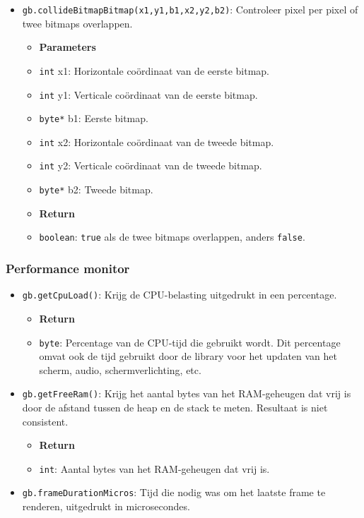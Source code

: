 \documentclass[a4paper,titlepage,12pt]{article}
\begin{document}
\begin{itemize}
		\item \texttt{gb.collideBitmapBitmap(x1,y1,b1,x2,y2,b2)}: 
		Controleer pixel per pixel of twee bitmaps overlappen.
		\begin{itemize}
			\item [] \textbf{Parameters}
			\item \texttt{int} x1: Horizontale coördinaat van de eerste bitmap.
			\item \texttt{int} y1: Verticale coördinaat van de eerste bitmap.
			\item  \texttt{byte*} b1: Eerste bitmap.
			\item \texttt{int} x2: Horizontale coördinaat van de tweede bitmap.
			\item \texttt{int} y2: Verticale coördinaat van de tweede bitmap.
			\item  \texttt{byte*} b2: Tweede bitmap.
		\end{itemize}
		\begin{itemize}
			\item [] \textbf{Return}
			\item \texttt{boolean}: \texttt{true} als de twee bitmaps overlappen, anders \texttt{false}.
		\end{itemize}
	\end{itemize}

	\subsubsection{Performance monitor}
	\begin{itemize}
		\item \texttt{gb.getCpuLoad()}: Krijg de CPU-belasting uitgedrukt in een percentage.
		\begin{itemize}
			\item [] \textbf{Return}
			\item \texttt{byte}: Percentage van de CPU-tijd die gebruikt wordt. Dit percentage omvat ook de tijd gebruikt door de library voor het updaten van het scherm, audio, schermverlichting, etc.
		\end{itemize}
		
		\item \texttt{gb.getFreeRam()}: Krijg het aantal bytes van het RAM-geheugen dat vrij is door de afstand tussen de heap en de stack te meten. Resultaat is niet consistent.
		\begin{itemize}
			\item [] \textbf{Return}
			\item \texttt{int}: Aantal bytes van het RAM-geheugen dat vrij is. 
		\end{itemize}
		
		\item  \texttt{gb.frameDurationMicros}: Tijd die nodig was om het laatste frame te renderen, uitgedrukt in microsecondes.
	\end{itemize}
\end{document}
